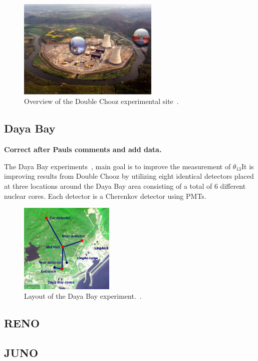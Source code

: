 \begin{figure}[h!]
\centering
\includegraphics[width=0.6\textwidth]{figures/doubleChooz.jpeg}
\caption{Overview of the Double Chooz experimental site~\cite{45DoubleChooz}.}
\label{fig:dc}
\end{figure}

\subsection{Daya Bay}
\textbf{Correct after Pauls comments and add data.}

The Daya Bay experiments~\cite{44DayaBay}, main goal is to improve the measurement of $\theta_{13}$It is improving results from Double Chooz by utilizing eight identical detectors placed at three locations around the Daya Bay area consisting of a total of 6 different nuclear cores. Each detector is a Cherenkov detector using PMTs.

\begin{figure}[h!]
\centering
\includegraphics[width=0.4\textwidth]{figures/DayaBay.jpeg}
\caption{Layout of the Daya Bay experiment.~\cite{44DayaBay}.}
\label{fig:DB}
\end{figure}

\subsection{RENO}

\subsection{JUNO}

